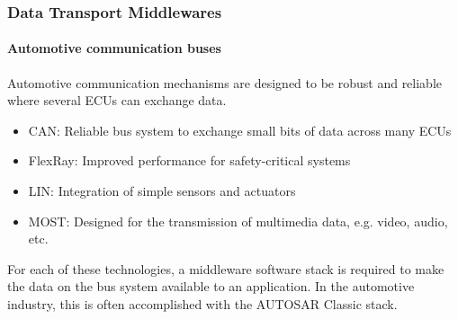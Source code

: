 \begin{frame}
\frametitle{Data Transport Middlewares}
\framesubtitle{Automotive communication buses}
Automotive communication mechanisms are designed to be robust and reliable
where several ECUs can exchange data.
\begin{itemize}
    \item CAN: Reliable bus system to exchange small bits of data across many ECUs
    \item FlexRay: Improved performance for safety-critical systems
    \item LIN: Integration of simple sensors and actuators
    \item MOST: Designed for the transmission of multimedia data,
        e.g. video, audio, etc.
\end{itemize}
For each of these technologies, a middleware software stack is required to make
the data on the bus system available to an application. In the automotive
industry, this is often accomplished with the AUTOSAR Classic stack.
\end{frame}

